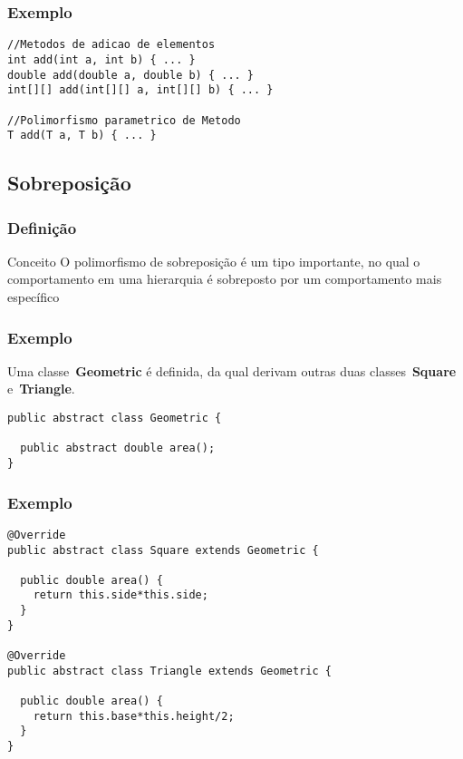 \begin{frame}[fragile]
\frametitle{Exemplo}
\justifying
\begin{lstlisting}
//Metodos de adicao de elementos
int add(int a, int b) { ... }
double add(double a, double b) { ... }
int[][] add(int[][] a, int[][] b) { ... }

//Polimorfismo parametrico de Metodo
T add(T a, T b) { ... }
\end{lstlisting}
\end{frame}

\subsection{Sobreposição}

\begin{frame}
\frametitle{Definição}
\justifying
\begin{block}{Conceito}
\qquad O polimorfismo de sobreposição é um tipo importante, no qual o comportamento em uma hierarquia é sobreposto por um comportamento mais específico
\end{block}
\end{frame}

\begin{frame}[fragile]
\frametitle{Exemplo}
\justifying
\quad Uma classe~\textbf{Geometric} é definida, da qual derivam outras duas classes~\textbf{Square} e~\textbf{Triangle}.
\begin{lstlisting}
public abstract class Geometric {
	
  public abstract double area();
}
\end{lstlisting}
\end{frame}

\begin{frame}[fragile]
\frametitle{Exemplo}
\justifying
\begin{lstlisting}
@Override
public abstract class Square extends Geometric {
	
  public double area() {
    return this.side*this.side;
  }
}

@Override
public abstract class Triangle extends Geometric {
	
  public double area() {
    return this.base*this.height/2;
  }
}
\end{lstlisting}
\end{frame}

